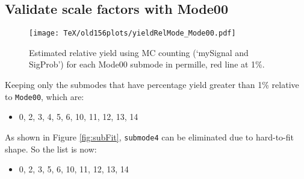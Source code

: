 \documentclass{article}
\begin{document}
\subsection{Validate scale factors with Mode00}
\begin{figure}[h!]
\begin{center}
\texttt{[image: TeX/old156plots/yieldRelMode\_Mode00.pdf]}
\caption{Estimated relative yield using MC counting (`mySignal and SigProb') for each Mode00 submode in permille, red line at 1\%.}
\end{center}
\end{figure}
Keeping only the submodes that have percentage yield greater than 1\% relative to \verb+Mode00+, which are:
\begin{itemize}
\item 0, 2, 3, 4, 5, 6, 10, 11, 12, 13, 14
\end{itemize}

As shown in Figure \ref{fig:subFit}, \verb+submode4+ can be eliminated due to hard-to-fit shape. 
So the list is now:\begin{itemize}
\item 0, 2, 3, 5, 6, 10, 11, 12, 13, 14
\end{itemize}
\end{document}
